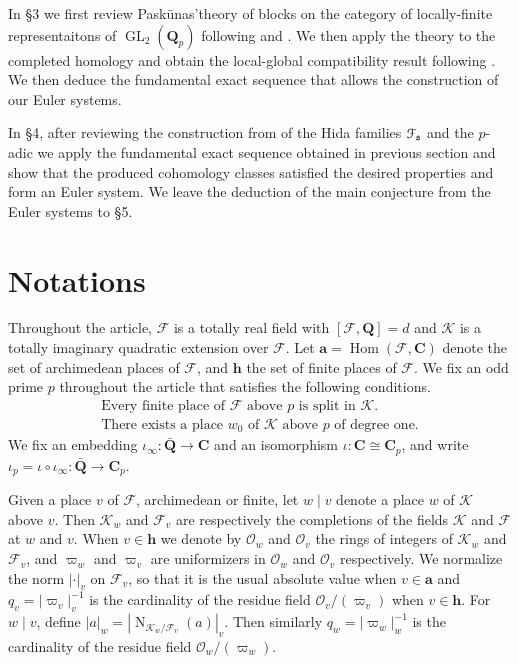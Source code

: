 \documentclass[leqno]{amsart}
\theoremstyle{definition}
\theoremstyle{remark}
\newcommand{\oo}{\mathcal{O}}
\newcommand{\Q}{{\mathbf{Q}}}
\newcommand{\C}{\mathbf C}
\newcommand{\arch}{\mathbf{a}}
\newcommand{\finite}{\mathbf{h}}
\DeclareMathOperator{\Nr}{N}
\DeclareMathOperator{\Hom}{Hom}
\DeclareMathOperator{\GL}{GL}
\newcommand{\fs}{\mathfrak{s}}
\newcommand{\F}{{\mathcal{F}}} %
\newcommand{\K}{{\mathcal{K}}} %
\newcommand{\euF}{\EuScript{F}} %
\begin{document}
In \S 3 we first review Pask\={u}nas'theory
of blocks on the category of locally-finite representaitons
of $\GL_2(\Q_p)$ following \cite{pask} and \cite{urban}.
We then apply the theory
to the completed homology and 
obtain the local-global compatibility result following \cite{pan}.
We then deduce the fundamental exact sequence
that allows the construction of our Euler systems.

In \S 4,
after reviewing the construction from \cite{lee}
of the Hida families $\euF_\fs$
and the $p$-adic 
we apply the fundamental exact sequence obtained
in previous section and show that 
the produced cohomology classes
satisfied the desired properties
and form an Euler system.
We leave the deduction of the main conjecture
from the Euler systems to \S 5.




\section{Notations}

Throughout the article, $\F$ is a totally real field 
with $[\F,\Q]=d$
and $\K$ is a totally imaginary quadratic extension over $\F$.
Let $\arch=\Hom(\F, \C)$ 
denote the set of archimedean places of $\F$,
and $\finite$ the set of finite places of $\F$.
We fix an odd prime $p$ throughout the article
that satisfies the following conditions.
\begin{align}\label{cond:ord}\tag{ord}
\text{Every finite place of $\F$ above $p$ is split in $\K$}.\\
\label{cond:deg}\tag{deg}
\text{There exists a place $w_0$ of $\K$ above $p$ of degree one}.
\end{align}
We fix an embedding $\iota_\infty:\bar{\Q}\to \C$
and an isomorphism $\iota:\C\cong \C_p$,
and write $\iota_p=\iota\circ\iota_\infty:\bar{\Q}\to \C_p$.


Given a place $v$ of $\F$, archimedean or finite,
let $w\mid v$ denote a place $w$ of $\K$ above $v$.
Then $\K_w$ and $\F_v$ are respectively
the completions of the fields $\K$ and $\F$ at $w$ and $v$.
When $v\in \finite$ we denote by $\oo_w$ and $\oo_v$ 
the rings of integers of $\K_w$ and $\F_v$, and
$\varpi_w$ and $\varpi_v$
are uniformizers in $\oo_w$ and $\oo_v$ respectively.
We normalize the norm $|\cdot|_v$ on $\F_v$,
so that it is the usual absolute value when $v\in \arch$
and $q_v=|\varpi_v|_v^{-1}$
is the cardinality of the residue field $\oo_v/(\varpi_v)$
when $v\in \finite$.
For $w\mid v$, define $|a|_w=|\Nr_{\K_w/\F_v}(a)|_v$.
Then similarly 
$q_w=|\varpi_w|_w^{-1}$
is the cardinality of the residue field $\oo_w/(\varpi_w)$.
\end{document}
